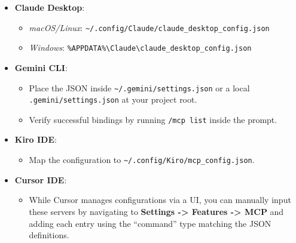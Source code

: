 \begin{itemize}
    \item \textbf{Claude Desktop}: 
    \begin{itemize}
        \item \textit{macOS/Linux}: \lstinline[style=inline]|~/.config/Claude/claude_desktop_config.json|
        \item \textit{Windows}: \lstinline[style=inline]|%APPDATA%\Claude\claude_desktop_config.json|
    \end{itemize}
    
    \item \textbf{Gemini CLI}: 
    \begin{itemize}
        \item Place the JSON inside \lstinline[style=inline]|~/.gemini/settings.json| or a local \lstinline[style=inline]|.gemini/settings.json| at your project root.
        \item Verify successful bindings by running \lstinline[style=inline]|/mcp list| inside the prompt.
    \end{itemize}
    
    \item \textbf{Kiro IDE}:
    \begin{itemize}
        \item Map the configuration to \lstinline[style=inline]|~/.config/Kiro/mcp_config.json|.
    \end{itemize}
    
    \item \textbf{Cursor IDE}:
    \begin{itemize}
        \item While Cursor manages configurations via a UI, you can manually input these servers by navigating to \textbf{Settings -> Features -> MCP} and adding each entry using the ``command'' type matching the JSON definitions.
    \end{itemize}
\end{itemize}
